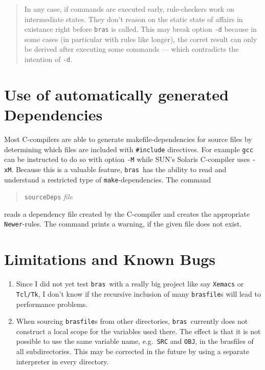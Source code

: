 \documentclass[12pt]{article}
\newcommand{\bras}{\texttt{bras}}
\newcommand{\make}{\texttt{make}}
\begin{document}
{\begin{quote}
In any case, if commands are executed early, rule-checkers work on
intermediate states. They don't reason on the static state of affairs
in existance right before \bras{} is called. This may break
option \texttt{-d} because in some cases (in particular with rules
like longer), the corret result can only be derived after executing
some commands --- which contradicts the intention of \texttt{-d}.
\end{quote}



\section{Use of automatically generated Dependencies}

Most C-compilers are able to generate makefile-dependencies for
source files by determining which files are included with
\texttt{\#include} directives. For example \texttt{gcc} can be
instructed to do so with option \texttt{-M} while SUN's Solaris
C-compiler uses \texttt{-xM}. Because this is a valuable feature,
\bras\ has the ability to read and understand a restricted type of
\make-dependencies. The command
\begin{quote}
  \texttt{sourceDeps} \textit{file}
\end{quote}
reads a dependency file created by the C-compiler and creates the
appropriate \texttt{Newer}-rules. The command prints a warning, if
the given file does not exist.
   
\section{Limitations and Known Bugs}


\begin{enumerate}
\item
Since I did not yet test \bras\ with a really big project like say
\texttt{Xemacs} or \texttt{Tcl/Tk}, I don't know if the recursive
inclusion of many \texttt{brasfile}s will lead to performance
problems.

\item
When sourcing \texttt{brasfile}s from other directories, \bras\
currently does not construct a local scope for the variables used
there. The effect is that it is not possible to use the same variable
name, e.g.\ \texttt{SRC} and \texttt{OBJ}, in the brasfiles
of all subdirectories. This may be corrected in the future by using a
separate interpreter in every directory.


\end{enumerate}}
\end{document}
